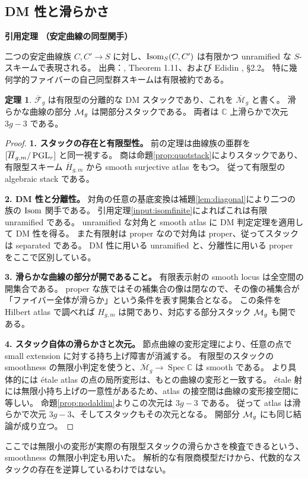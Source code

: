 \documentclass[dvipdfmx,a4paper,11pt]{article}
\theoremstyle{definition}
\newtheorem{thm}{定理}[section]
\newcommand{\C}{\mathbb C}\newcommand{\R}{\mathbb R}\newcommand{\Z}{\mathbb Z}\newcommand{\Q}{\mathbb Q}
\DeclareMathOperator{\Spec}{Spec}\DeclareMathOperator{\Proj}{Proj}\DeclareMathOperator{\GL}{GL}
\newcommand{\cM}{\overline{\mathcal M}}
\newenvironment{external}[1]{\Needspace{7\baselineskip}\refstepcounter{thm}\begin{tcolorbox}[mybox,colback=blue!2,colframe=blue!40!black]\textbf{引用定理 \thethm（#1）}\par}{\end{tcolorbox}}
\begin{document}
\subsection{DM 性と滑らかさ}
\begin{external}{安定曲線の同型関手}\label{input:isomfinite}
二つの安定曲線族 $C,C'\to S$ に対し、$\operatorname{Isom}_S(C,C')$ は有限かつ unramified な $S$-スキームで表現される。
出典：\cite{DM}, Theorem 1.11、および Edidin \cite{Edidin}, \S2.2。
特に幾何学的ファイバーの自己同型群スキームは有限被約である。
\end{external}
\begin{thm}\label{thm:dmcurves}
$\overline{\mathcal F}_g$ は有限型の分離的な DM スタックであり、これを $\cM_g$ と書く。
滑らかな曲線の部分 $\mathcal M_g$ は開部分スタックである。
両者は $\C$ 上滑らかで次元 $3g-3$ である。
\end{thm}
\begin{proof}
\textbf{1. スタックの存在と有限型性。}
前の定理は曲線族の亜群を $[\overline H_{g,m}/\operatorname{PGL}_r]$ と同一視する。
商は命題\ref{prop:quotstack}によりスタックであり、有限型スキーム $\overline H_{g,m}$ から smooth surjective atlas をもつ。
従って有限型の algebraic stack である。

\textbf{2. DM 性と分離性。}
対角の任意の基底変換は補題\ref{lem:diagonal}により二つの族の $\operatorname{Isom}$ 関手である。
引用定理\ref{input:isomfinite}によればこれは有限 unramified である。
unramified な対角と smooth atlas に DM 判定定理を適用して DM 性を得る。
また有限射は proper なので対角は proper、従ってスタックは separated である。
DM 性に用いる unramified と、分離性に用いる proper をここで区別している。

\textbf{3. 滑らかな曲線の部分が開であること。}
有限表示射の smooth locus は全空間の開集合である。
proper な族ではその補集合の像は閉なので、その像の補集合が「ファイバー全体が滑らか」という条件を表す開集合となる。
この条件を Hilbert atlas で調べれば $H_{g,m}$ は開であり、対応する部分スタック $\mathcal M_g$ も開である。

\textbf{4. スタック自体の滑らかさと次元。}
節点曲線の変形定理により、任意の点で small extension に対する持ち上げ障害が消滅する。
有限型のスタックの smoothness の無限小判定を使うと、$\cM_g\to\Spec\C$ は smooth である。
より具体的には étale atlas の点の局所変形は、もとの曲線の変形と一致する。
étale 射には無限小持ち上げの一意性があるため、atlas の接空間は曲線の変形接空間に等しい。
命題\ref{prop:nodaldim}よりこの次元は $3g-3$ である。
従って atlas は滑らかで次元 $3g-3$、そしてスタックもその次元となる。
開部分 $\mathcal M_g$ にも同じ結論が成り立つ。
\end{proof}
ここでは無限小の変形が実際の有限型スタックの滑らかさを検査できるという、smoothness の無限小判定も用いた。
解析的な有限商模型だけから、代数的なスタックの存在を逆算しているわけではない。
\end{document}
